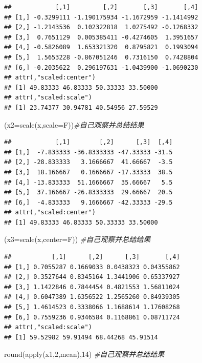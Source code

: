\documentclass[
]{book}
\newenvironment{Shaded}{\begin{snugshade}}{\end{snugshade}}
\newcommand{\AttributeTok}[1]{\textcolor[rgb]{0.77,0.63,0.00}{#1}}
\newcommand{\CommentTok}[1]{\textcolor[rgb]{0.56,0.35,0.01}{\textit{#1}}}
\newcommand{\DecValTok}[1]{\textcolor[rgb]{0.00,0.00,0.81}{#1}}
\newcommand{\FunctionTok}[1]{\textcolor[rgb]{0.00,0.00,0.00}{#1}}
\newcommand{\NormalTok}[1]{#1}
\begin{document}
\begin{verbatim}
##            [,1]         [,2]       [,3]       [,4]
## [1,] -0.3299111 -1.190175934 -1.1672959 -1.1414992
## [2,] -1.2143536  0.102322818  1.0275492 -0.1268332
## [3,]  0.7651129  0.005385411 -0.4274605  1.3951657
## [4,] -0.5826089  1.653321320  0.8795821  0.1993094
## [5,]  1.5653228 -0.867051246  0.7316150  0.7428804
## [6,] -0.2035622  0.296197631 -1.0439900 -1.0690230
## attr(,"scaled:center")
## [1] 49.83333 46.83333 50.33333 33.50000
## attr(,"scaled:scale")
## [1] 23.74377 30.94781 40.54956 27.59529
\end{verbatim}

\begin{Shaded}
\begin{Highlighting}[]
\NormalTok{(}\AttributeTok{x2=}\FunctionTok{scale}\NormalTok{(x,}\AttributeTok{scale=}\NormalTok{F))}\CommentTok{\#自己观察并总结结果}
\end{Highlighting}
\end{Shaded}

\begin{verbatim}
##            [,1]        [,2]      [,3]  [,4]
## [1,]  -7.833333 -36.8333333 -47.33333 -31.5
## [2,] -28.833333   3.1666667  41.66667  -3.5
## [3,]  18.166667   0.1666667 -17.33333  38.5
## [4,] -13.833333  51.1666667  35.66667   5.5
## [5,]  37.166667 -26.8333333  29.66667  20.5
## [6,]  -4.833333   9.1666667 -42.33333 -29.5
## attr(,"scaled:center")
## [1] 49.83333 46.83333 50.33333 33.50000
\end{verbatim}

\begin{Shaded}
\begin{Highlighting}[]
\NormalTok{(}\AttributeTok{x3=}\FunctionTok{scale}\NormalTok{(x,}\AttributeTok{center=}\NormalTok{F)) }\CommentTok{\#自己观察并总结结果}
\end{Highlighting}
\end{Shaded}

\begin{verbatim}
##           [,1]      [,2]      [,3]       [,4]
## [1,] 0.7055287 0.1669033 0.0438323 0.04355862
## [2,] 0.3527644 0.8345164 1.3441906 0.65337927
## [3,] 1.1422846 0.7844454 0.4821553 1.56811024
## [4,] 0.6047389 1.6356522 1.2565260 0.84939305
## [5,] 1.4614523 0.3338066 1.1688614 1.17608268
## [6,] 0.7559236 0.9346584 0.1168861 0.08711724
## attr(,"scaled:scale")
## [1] 59.52982 59.91494 68.44268 45.91514
\end{verbatim}

\begin{Shaded}
\begin{Highlighting}[]
\FunctionTok{round}\NormalTok{(}\FunctionTok{apply}\NormalTok{(x1,}\DecValTok{2}\NormalTok{,mean),}\DecValTok{14}\NormalTok{) }\CommentTok{\#自己观察并总结结果}
\end{Highlighting}
\end{Shaded}
\end{document}
